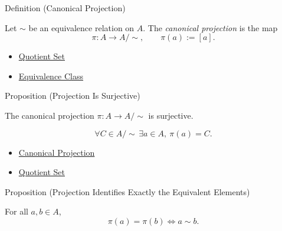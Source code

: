\begin{definitionbox}{Definition (Canonical Projection)}
\begin{definition}
\label{def:canonical-projection}
Let $\sim$ be an equivalence relation on $A$. The \emph{canonical projection}
is the map
\[
\pi:A\to A/{\sim},
\qquad
\pi(a):=[a].
\]
\end{definition}
\end{definitionbox}

\begin{dependencies}
\begin{itemize}
  \item \hyperref[def:quotient-set]{Quotient Set}
  \item \hyperref[def:equivalence-class]{Equivalence Class}
\end{itemize}
\end{dependencies}

\begin{propositionbox}{Proposition (Projection Is Surjective)}
\begin{proposition}
\label{prop:projection-is-surjective}
The canonical projection $\pi:A\to A/{\sim}$ is surjective.
\end{proposition}
\end{propositionbox}

\begin{remark*}
\[
\forall C\in A/{\sim}\,\exists a\in A,\ \pi(a)=C.
\]
\end{remark*}

\begin{dependencies}
\begin{itemize}
  \item \hyperref[def:canonical-projection]{Canonical Projection}
  \item \hyperref[def:quotient-set]{Quotient Set}
\end{itemize}
\end{dependencies}

\begin{propositionbox}{Proposition (Projection Identifies Exactly the Equivalent Elements)}
\begin{proposition}
\label{prop:projection-identifies-equivalent-elements}
For all $a,b\in A$,
\[
\pi(a)=\pi(b)\Longleftrightarrow a\sim b.
\]
\end{proposition}
\end{propositionbox}

